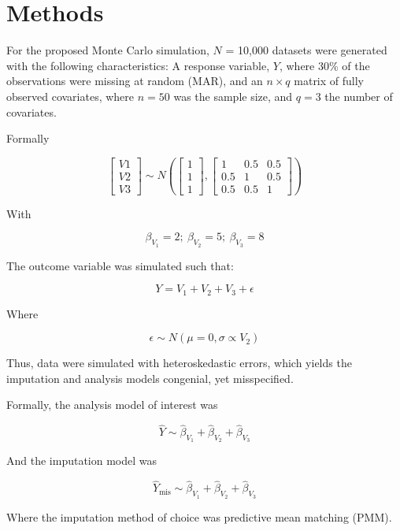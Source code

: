 \documentclass[
  letterpaper,
  DIV=11,
  numbers=noendperiod]{scrreprt}
\begin{document}

\hypertarget{methods}{%
\chapter{Methods}\label{methods}}

For the proposed Monte Carlo simulation, \(N\) = 10,000 datasets were
generated with the following characteristics: A response variable,
\(Y\), where 30\% of the observations were missing at random (MAR), and
an \(n \times q\) matrix of fully observed covariates, where \(n = 50\)
was the sample size, and \(q = 3\) the number of covariates.

Formally

\[
\begin{bmatrix} V1 \\V2 \\ V3 \end{bmatrix} \sim N\left(\begin{bmatrix} 1\\ 1 \\ 1 \end{bmatrix}, \begin{bmatrix} 1 & 0.5 & 0.5 \\
0.5 & 1 & 0.5 \\
0.5 & 0.5 & 1
\end{bmatrix}\right)
\]

With

\[
\beta_{V_1} = 2 ; \  \beta_{V_2} = 5 ; \ \beta_{V_3} = 8
\]

The outcome variable was simulated such that:

\[
Y = V_1 + V_2 + V_3 + \epsilon
\]

Where

\[
\epsilon \sim N(\mu = 0, \sigma \propto V_2)
\]

Thus, data were simulated with heteroskedastic errors, which yields the
imputation and analysis models congenial, yet misspecified.

Formally, the analysis model of interest was

\[
\widehat{Y} \sim \widehat{\beta}_{V_1} + \widehat{\beta}_{V_2} + \widehat{\beta}_{V_3} 
\]

And the imputation model was

\[
\widehat{Y}_{\text{mis}} \sim \widehat{\beta}_{V_1} + \widehat{\beta}_{V_2} + \widehat{\beta}_{V_3}
\]

Where the imputation method of choice was predictive mean matching
(PMM).
\end{document}
